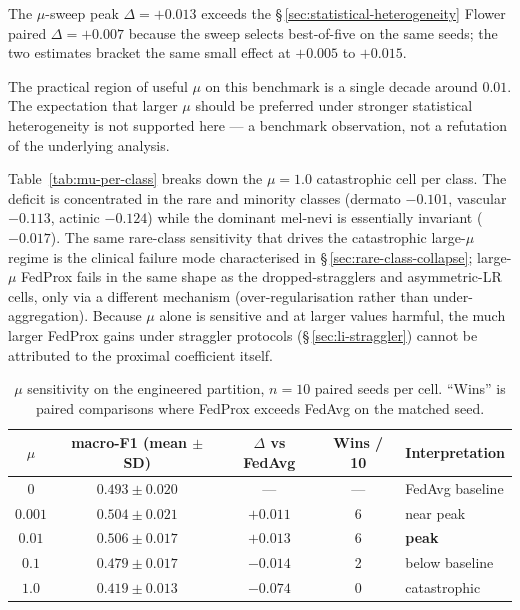 \documentclass[11pt,a4paper]{report}
\begin{document}
The $\mu$-sweep peak $\Delta = +0.013$ exceeds the
\S\,\ref{sec:statistical-heterogeneity} Flower paired $\Delta = +0.007$
because the sweep selects best-of-five on the same seeds; the two estimates
bracket the same small effect at $+0.005$ to $+0.015$.

The practical region of useful $\mu$ on this benchmark is a single decade
around $0.01$. The expectation that larger $\mu$ should be preferred under
stronger statistical heterogeneity is not supported here --- a benchmark
observation, not a refutation of the underlying analysis.

Table~\ref{tab:mu-per-class} breaks down the $\mu = 1.0$ catastrophic cell
per class. The deficit is concentrated in the rare and minority classes
(dermato $-0.101$, vascular $-0.113$, actinic $-0.124$) while the dominant
mel-nevi is essentially invariant ($-0.017$). The same rare-class
sensitivity that drives the catastrophic large-$\mu$ regime is the
clinical failure mode characterised in
\S\,\ref{sec:rare-class-collapse}; large-$\mu$ FedProx fails in the same
shape as the dropped-stragglers and asymmetric-LR cells, only via a
different mechanism (over-regularisation rather than under-aggregation).
Because $\mu$ alone is sensitive and at larger values harmful, the much
larger FedProx gains under straggler protocols
(\S\,\ref{sec:li-straggler}) cannot be attributed to the proximal
coefficient itself.



\begin{table}[H]
\centering
\caption{$\mu$ sensitivity on the engineered partition, $n=10$ paired
seeds per cell. ``Wins'' is paired comparisons where FedProx exceeds
FedAvg on the matched seed.}
\label{tab:mu-sweep}
\begin{tabular}{ccccl}
\hline
$\mu$    & macro-F1 (mean $\pm$ SD) & $\Delta$ vs FedAvg & Wins / 10 & Interpretation \\
\hline
$0$      & $0.493 \pm 0.020$        & ---               & ---       & FedAvg baseline                \\
$0.001$  & $0.504 \pm 0.021$        & $+0.011$          & 6         & near peak                      \\
$0.01$   & $\mathbf{0.506 \pm 0.017}$ & $\mathbf{+0.013}$ & 6       & \textbf{peak}                  \\
$0.1$    & $0.479 \pm 0.017$        & $-0.014$          & 2         & below baseline                 \\
$1.0$    & $0.419 \pm 0.013$        & $-0.074$          & 0         & catastrophic                   \\
\hline
\end{tabular}
\end{table}
\end{document}

